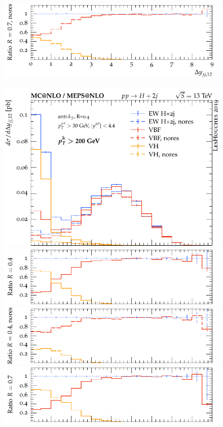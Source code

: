 \documentclass[10pt,prd,fleqn,superscriptaddress,notitlepage,nofootinbib,preprintnumbers,nobalancelastpage]{revtex4-1}
\begin{document}
\begin{figure}[p]
\begin{minipage}{0.28\textwidth}
    \includegraphics[width=\textwidth]{figures/vbfvh/nores-pt0-ratio4.pdf}
    \end{minipage}\hfill
    \begin{minipage}{0.28\textwidth}
     \includegraphics[width=\textwidth]{figures/vbfvh/nores-pt200-main.pdf}
     \includegraphics[width=\textwidth]{figures/vbfvh/nores-pt200-ratio1.pdf}
    \includegraphics[width=\textwidth]{figures/vbfvh/nores-pt200-ratio2.pdf}
    \includegraphics[width=\textwidth]{figures/vbfvh/nores-pt200-ratio3.pdf}

\end{minipage}
\end{figure}
\end{document}
